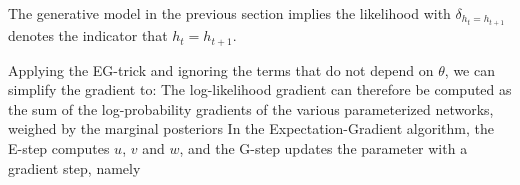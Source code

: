 The generative model in the previous section implies the likelihood
with
$\delta_{h_t = h_{t+1}}$ denotes the indicator that $h_t = h_{t+1}$.

Applying the EG-trick and ignoring the terms that do not depend on $\theta$, we can simplify the gradient to:
The log-likelihood gradient can therefore be computed as the sum of the log-probability gradients of the various parameterized networks, weighed by the marginal posteriors
In the Expectation-Gradient algorithm, the E-step computes $u$, $v$ and $w$, and the G-step updates the parameter with a gradient step, namely

